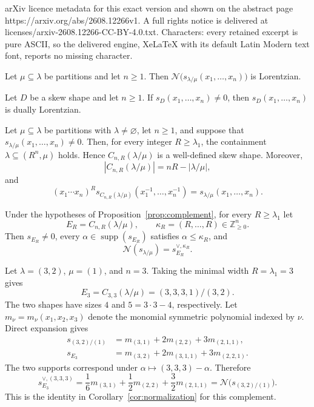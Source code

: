 \documentclass[10pt,a4paper]{amsart}
\newcommand{\Nop}{\mathcal N}
\newcommand{\Znonneg}{\mathbb Z_{\ge0}}
\newcommand{\supp}{\operatorname{supp}}
\begin{document}
arXiv licence metadata for this exact version and shown on the abstract page https://arxiv.org/abs/2608.12266v1. A full rights notice is delivered at licenses/arxiv-2608.12266-CC-BY-4.0.txt. Characters: every retained excerpt is pure ASCII, so the delivered engine, XeLaTeX with its default Latin Modern text font, reports no missing character.
\begin{theorem}\label{thm:main}
Let $\mu\subseteq\lambda$ be partitions and let $n\ge1$.  Then
$\Nop\bigl(s_{\lambda/\mu}(x_1,\ldots,x_n)\bigr)$ is Lorentzian.
\end{theorem}

\begin{theorem}\label{thm:dual-intro}
Let $D$ be a skew shape and let $n\ge1$.  If
$s_D(x_1,\ldots,x_n)\ne0$, then $s_D(x_1,\ldots,x_n)$ is dually
Lorentzian.
\end{theorem}

\begin{proposition}\label{prop:complement}
Let $\mu\subseteq\lambda$ be partitions with $\lambda\ne\varnothing$, let
$n\ge1$, and suppose that
$s_{\lambda/\mu}(x_1,\ldots,x_n)\ne0$.  Then, for every integer
$R\ge\lambda_1$, the containment $\lambda\subseteq(R^n,\mu)$ holds.  Hence
$C_{n,R}(\lambda/\mu)$ is a well-defined skew shape.  Moreover,
\[
  |C_{n,R}(\lambda/\mu)|=nR-|\lambda/\mu|,
\]
and
\begin{equation}\label{eq:complement-reverse}
  (x_1\cdots x_n)^R
  s_{C_{n,R}(\lambda/\mu)}(x_1^{-1},\ldots,x_n^{-1})
  =s_{\lambda/\mu}(x_1,\ldots,x_n).
\end{equation}
\end{proposition}

\begin{corollary}\label{cor:normalization}
Under the hypotheses of Proposition~\ref{prop:complement}, for every
$R\ge\lambda_1$ let
\[
  E_R=C_{n,R}(\lambda/\mu),
  \qquad
  \kappa_R=(R,\ldots,R)\in\Znonneg^n.
\]
Then $s_{E_R}\ne0$, every $\alpha\in\supp(s_{E_R})$ satisfies
$\alpha\le\kappa_R$, and
\begin{equation}\label{eq:normalization-identity}
  \Nop(s_{\lambda/\mu})=s_{E_R}^{\vee,\kappa_R}.
\end{equation}
\end{corollary}

\begin{example}\label{ex:complement}
Let $\lambda=(3,2)$, $\mu=(1)$, and $n=3$.  Taking the minimal width
$R=\lambda_1=3$ gives
\[
  E_3=C_{3,3}(\lambda/\mu)=(3,3,3,1)/(3,2).
\]
The two shapes have sizes $4$ and $5=3\cdot3-4$, respectively.  Let
$m_\nu=m_\nu(x_1,x_2,x_3)$ denote the monomial symmetric polynomial indexed
by $\nu$.  Direct expansion gives
\begin{align*}
  s_{(3,2)/(1)}
  &=m_{(3,1)}+2m_{(2,2)}+3m_{(2,1,1)},\\
  s_{E_3}
  &=m_{(3,2)}+2m_{(3,1,1)}+3m_{(2,2,1)}.
\end{align*}
The two supports correspond under
$\alpha\mapsto(3,3,3)-\alpha$.  Therefore
\[
  s_{E_3}^{\vee,(3,3,3)}
  =\frac{1}{6}m_{(3,1)}
   +\frac{1}{2}m_{(2,2)}
   +\frac{3}{2}m_{(2,1,1)}
  =\Nop\bigl(s_{(3,2)/(1)}\bigr).
\]
This is the identity in Corollary~\ref{cor:normalization} for this
complement.
\end{example}
\end{document}
